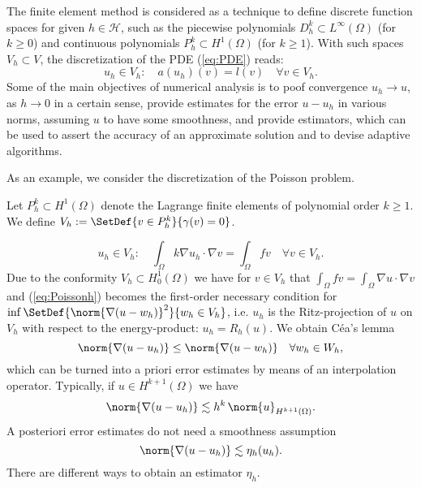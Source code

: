 The finite element method is considered as a technique to define discrete function spaces for given $h\in\mathcal H$, such as the piecewise polynomials $D_h^k\subset L^{\infty}(\Omega)$ (for $k\ge0$) and continuous polynomials 
$P_h^k\subset H^1(\Omega)$ (for $k\ge1$). With such spaces $V_h\subset V$, the discretization of the PDE (\ref{eq:PDE}) reads:
%
\begin{equation}\label{eq:PDEh}
u_h\in V_h:\quad a(u_h)(v) = l(v)\quad\forall v\in V_h.
\end{equation}
%
Some of the main objectives of numerical analysis is to poof convergence $u_h\to u$, as $h\to0$ in a certain sense, provide estimates for the error $u-u_h$ in various norms, assuming $u$ to have some smoothness, and provide estimators, which can be used to assert the accuracy of an approximate solution and to devise adaptive algorithms. 

As an example, we consider the discretization of the Poisson problem.
%
\begin{example}[continues=example:Poisson]
%
Let $P^k_h\subset H^1(\Omega)$ denote the Lagrange finite elements of polynomial order $k\ge1$. We define 
$V_h:=\SetDef{v\in P^k_h}{\gamma(v)=0}$.

\begin{equation}\label{eq:Poissonh}
u_h\in V_h:\quad \int_{\Omega}k\nabla u_h\cdot \nabla v = \int_{\Omega} fv \quad\forall v\in  V_h.
\end{equation}
%
Due to the conformity $V_h\subset H^1_0(\Omega)$ we have for $v\in V_h $ that 
$\int_{\Omega} fv = \int_{\Omega}\nabla u\cdot \nabla v$ and (\ref{eq:Poissonh}) becomes the first-order necessary condition for $\inf\SetDef{\norm{\nabla(u-w_h)}^2}{w_h\in V_h}$, i.e. $u_h$ is the Ritz-projection 
of $u$ on $V_h$ with respect to the energy-product: $u_h=R_h(u)$. We obtain Céa's lemma
%
\begin{equation}\label{eq:cea}
\norm{\nabla(u-u_h)} \le \norm{\nabla(u-w_h)}\quad \forall w_h\in W_h,
\end{equation}
%
which can be turned into a priori error estimates by means of an interpolation operator. Typically, if $u\in H^{k+1}(\Omega)$ we have
%
\begin{equation}\label{eq:eeap}
\norm{\nabla(u-u_h)} \lesssim h^k\, \norm{u}_{H^{k+1}(\Omega)}.
\end{equation}
%
A posteriori error estimates do not need a smoothness assumption
%
\begin{equation}\label{eq:est}
\norm{\nabla(u-u_h)} \lesssim \eta_h(u_h).
\end{equation}
%
There are different ways to obtain an estimator $\eta_h$.
%
\end{example}
%

